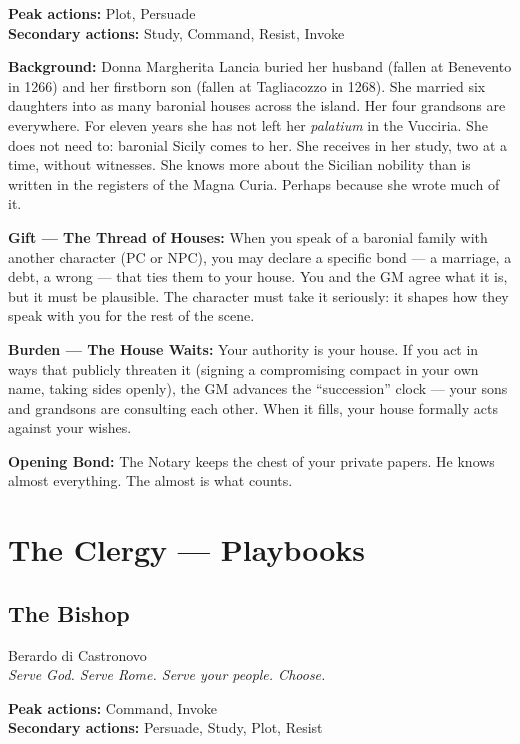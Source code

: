 \textbf{Peak actions:} Plot, Persuade\\
\textbf{Secondary actions:} Study, Command, Resist, Invoke

\textbf{Background:} Donna Margherita Lancia buried her husband
(fallen at Benevento in 1266) and her firstborn son (fallen at
Tagliacozzo in 1268). She married six daughters into as many
baronial houses across the island. Her four grandsons are
everywhere. For eleven years she has not left her \textit{palatium}
in the Vucciria. She does not need to: baronial Sicily comes to
her. She receives in her study, two at a time, without witnesses.
She knows more about the Sicilian nobility than is written in the
registers of the Magna Curia. Perhaps because she wrote much of it.

\textbf{Gift --- The Thread of Houses:} When you speak of a
baronial family with another character (PC or NPC), you may declare
a specific bond --- a marriage, a debt, a wrong --- that ties them
to your house. You and the GM agree what it is, but it must be
plausible. The character must take it seriously: it shapes how
they speak with you for the rest of the scene.

\textbf{Burden --- The House Waits:} Your authority is your house.
If you act in ways that publicly threaten it (signing a compromising
compact in your own name, taking sides openly), the GM advances
the ``succession'' clock --- your sons and grandsons are consulting
each other. When it fills, your house formally acts against
your wishes.

\textbf{Opening Bond:} The Notary keeps the chest of your private
papers. He knows almost everything. The almost is what counts.

\secsep

\section{The Clergy — Playbooks}

\subsection{The Bishop}
{\cinzel\footnotesize\color{grigionote} Berardo di Castronovo}\\
\textit{Serve God. Serve Rome. Serve your people. Choose.}

\textbf{Peak actions:} Command, Invoke\\
\textbf{Secondary actions:} Persuade, Study, Plot, Resist


